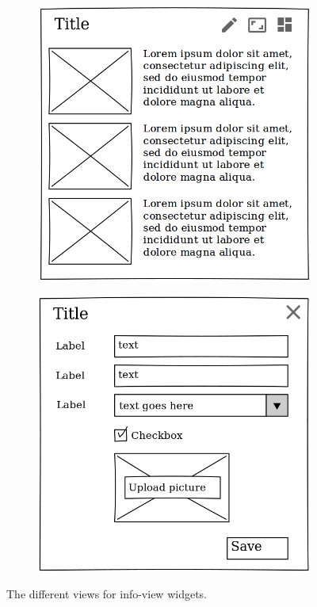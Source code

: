 \documentclass{sigchi}
\begin{document}
\begin{figure}
\begin{subfigure}{0.4\columnwidth}
		\caption{}
		\label{fig:widget-default-undocked}
	\end{subfigure}
	\hfill
	\begin{subfigure}{0.4\columnwidth}
		\includegraphics[width=\textwidth]{figures/widget-full}
		\caption{}
		\label{fig:widget-full}
	\end{subfigure}
	\hfill
	\begin{subfigure}{0.4\columnwidth}
		\includegraphics[width=\textwidth]{figures/widget-editmode}
		\caption{}
		\label{fig:widget-editmode}
	\end{subfigure}
	
	\caption{The different views for info-view widgets.}
	\label{fig:infoview-widgets}
\end{figure}
\end{document}
